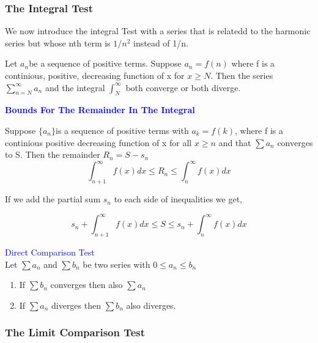 \documentclass[12pt,a4paper]{article}
\newenvironment{theorem}{\begin{theorembox}}{\end{theorembox}\vspace{1\baselineskip}}
\newcommand{\anc}{\(\{a_n\}\)}
\newcommand{\an}{\(a_n\)}
\begin{document}
\subsubsection*{The Integral Test}

We now introduce the integral Test with a series that is relatedd to the harmonic series but whose nth term is $1/n^2$ instead of 1/n.

\begin{theorem}
    Let \an be a sequence of positive terms. Suppose \(a_n = f(n)\) where f is a continious, positive, decreasing function of x for \(x \geq N\). Then the series \(\sum_{n=N}^{\infty}a_n\) and the integral \(\int_{N}^{\infty}\) both converge or both diverge.
\end{theorem}


\begin{note}

\textcolor{blue}{\textbf{Bounds For The Remainder In The Integral}}

Suppose \anc is a sequence of positive terms with \(a_k = f(k)\), where f is a continious positive decreasing function of x for all $x \geq n$ and that \(\sum a_n\) converges to S. Then the remainder \(R_n = S - s_n\)
\[\int_{n+1}^{\infty}f(x)dx \leq R_n \leq \int_{n}^{\infty}f(x)dx\]

If we add the partial sum \(s_n\) to each side of inequalities we get,

\[s_n + \int_{n+1}^{\infty}f(x)dx \leq S \leq s_n + \int_{n}^{\infty}f(x)dx\]
\end{note}

\begin{theorem}
\textcolor{blue}{Direct Comparison Test} \\
Let \(\sum a_n\) and \(\sum b_n\) be two series with \(0 \leq a_n \leq b_n\)
\begin{enumerate}
    \item If \(\sum b_n\) converges then also \(\sum a_n\)
    \item If \(\sum a_n\) diverges then \(\sum b_n\) also diverges.
\end{enumerate}
\end{theorem}

\subsubsection*{The Limit Comparison Test}
\end{document}
